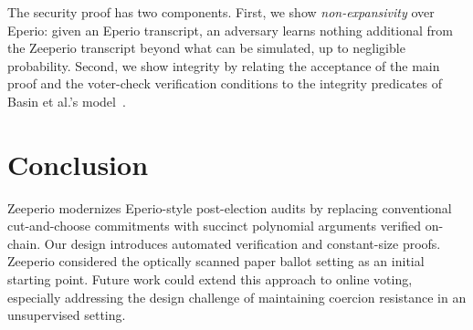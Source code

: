 The security proof has two components. First, we show \emph{non-expansivity} over Eperio: given an Eperio transcript, an adversary
learns nothing additional from the Zeeperio transcript beyond what can be simulated, up to negligible
probability. Second, we show integrity by relating the acceptance of the main proof and the voter-check
verification conditions to the integrity predicates of Basin et al.'s model~\cite{BDGR21}.



\section{Conclusion}
Zeeperio modernizes Eperio-style post-election audits by replacing conventional cut-and-choose commitments with succinct polynomial arguments verified on-chain. Our design introduces automated verification and constant-size proofs. Zeeperio considered the optically scanned paper ballot setting as an initial starting point. Future work could extend this approach to online voting, especially addressing the design challenge of maintaining coercion resistance in an unsupervised setting.
